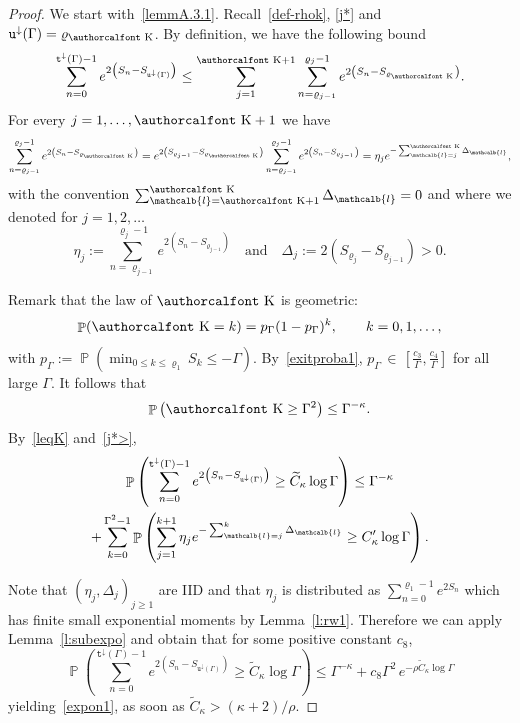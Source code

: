 \documentclass[10pt]{amsart}
\theoremstyle{definition}\newtheorem{defi}[theo]{Definition}\newtheorem{rema}[theo]{Remark}\newtheorem{exam}[theo]{Example}\newtheorem{exem}[theo]{Example}\newtheorem{nota}[theo]{Notation}
\renewcommand{\mathcal}[1]{\text{\authorcalfont #1}}
\newcommand{\gk}{\kappa}
\renewcommand*\ss{\mathtt{u}}
\newcommand{\ttt}{\mathtt{t}}
\newcommand*\td{{\ttt}^\downarrow}
\newcommand{\tudown}{\ss^\downarrow}
\DeclareMathOperator{\p}{\mathbb{P}}
\renewcommand{\ell}{\mathcalb{l}}
\newcommand{\clK}{\mathcal{K}}
\begin{document}
\begin{proof}
We start with~\eqref{lemmA.3.1}. Recall~\eqref{def-rhok}, \eqref{j*} and $\tudown(\Gamma)=\varrho_{\clK}$. By definition, we have the following bound
\begin{equation}\label{leqK}
\sum_{n=0}^{\td(\Gamma)-1} e^{2 \left(S_n- S_{\tudown(\Gamma)}\right)}\le
\sum_{j=1}^{{\clK}+1}
\sum_{n=\varrho_{j-1}}^{\varrho_{j}-1} e^{ 2 \left(S_n- S_{\varrho_{\clK}}\right)}.
\end{equation}
For every {{ $j= 1, \dots, \clK+1$}} we have
\begin{equation}
\sum_{n=\varrho_{j-1}}^{\varrho_{j}-1} e^{ 2 \left(S_n- S_{\varrho_{\clK}}\right)} =e^{2 \left(S_{\varrho_{j-1}}- S_{\varrho_{\clK}}\right)} \sum_{n=\varrho_{j-1}}^{\varrho_{j}-1} e^{ 2 \left(S_n- S_{\varrho_{j-1}}\right)} = \eta_{j} e^{- \sum_{\ell=j}^{\clK} \Delta_\ell},
\end{equation}
with the convention $\sum_{\ell= {\clK}+1}^{\clK} \Delta_\ell=0$ and where we denoted for $j=1,2, \dots$
\begin{equation}
\eta_j:= \sum_{n=\varrho_{j-1}}^{\varrho_{j}-1} e^{ 2\left(S_n- S_{\varrho_{j-1}}\right)}\quad\text{and}\quad
\Delta_j:= 2(S_{\varrho_j}- S_{\varrho_{j-1}})>0.
\end{equation}

Remark that the law of ${\clK}$ is geometric:
\begin{equation}
\p({\clK}=k)= p_\Gamma (1-p_\Gamma)^{k}, \qquad k= 0,1, \dots,
\end{equation}
with $p_\Gamma:=\p\left(\min_{0\le k\le \varrho_1} S_k \le -\Gamma \right) $. By~\eqref{exitproba1}, $p_\Gamma\,\in\, [\frac{c_3}\Gamma, \frac{c_4}\Gamma] $ for all large $\Gamma$. It follows that
\begin{equation}
\p\left({\clK} \ge \Gamma^2\right) \le \Gamma^{-\kappa}.\label{j*>}
\end{equation}
By~\eqref{leqK} and~\eqref{j*>},
\begin{multline}\label{I_1}
\p\left(\sum_{n=0}^{\td(\Gamma)-1} e^{2 \left(S_n- S_{\tudown(\Gamma)}\right)} \ge \widetilde{C}_\kappa \log \Gamma\right) \le
\Gamma^{-\kappa}\\ + \sum_{k=0}^{\Gamma^2-1} \p\left(\sum_{j=1}^{k+1} \eta_j e^{- \sum_{\ell=j}^k \Delta_\ell} \ge C_\gk' \log \Gamma\right).
\end{multline}


Note that $(\eta_j, \Delta_j)_{j\ge 1}$ are IID and that $\eta_j$ is distributed as $\sum_{n=0}^{\varrho_1-1} e^{2 S_n}$ which has finite small exponential moments by Lemma~\ref{l:rw1}. Therefore we can apply Lemma~\ref{l:subexpo} and obtain that for some positive constant $c_8$,
\begin{equation}
\p\left(\sum_{n=0}^{\td(\Gamma)-1} e^{2 \left(S_n- S_{\tudown(\Gamma)}\right)} \ge \widetilde{C}_\kappa \log \Gamma\right)
\le
\Gamma^{-\kappa} + c_8 \Gamma^2\, e^{-\rho  \widetilde{C}_\kappa \log \Gamma}
\end{equation}
yielding~\eqref{expon1}, as soon as $\widetilde{C}_\kappa>(\gk+2)/\rho$.


\end{proof}
\end{document}
